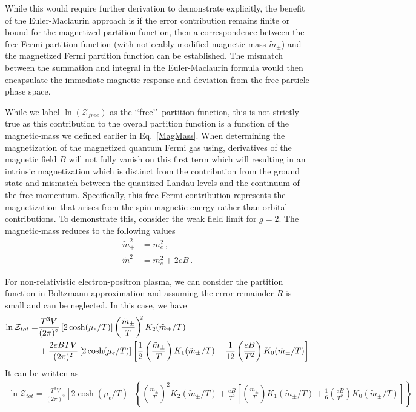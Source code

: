 \documentclass[Universe,article,submit,moreauthors,pdftex]{Definitions/mdpi}
\newcommand*{\req}[1]{Eq.~{\eqref{#1}}}
\begin{document}
While this would require further derivation to demonstrate explicitly, the benefit of the Euler-Maclaurin approach is if the error contribution remains finite or bound for the magnetized partition function, then a correspondence between the free Fermi partition function (with noticeably modified magnetic-mass $\tilde{m}_{\pm}$) and the magnetized Fermi partition function can be established. The mismatch between the summation and integral in the Euler-Maclaurin formula would then encapsulate the immediate magnetic response and deviation from the free particle phase space.

While we label $\ln(\mathcal{Z}_{free})$ as the \lq\lq free\rq\rq\ partition function, this is not strictly true as this contribution to the overall partition function is a function of the magnetic-mass we defined earlier in \req{MagMass}. When determining the magnetization of the magnetized quantum Fermi gas using, derivatives of the magnetic field $B$ will not fully vanish on this first term which will resulting in an intrinsic magnetization which is distinct from the contribution from the ground state and mismatch between the quantized Landau levels and the continuum of the free momentum. Specifically, this free Fermi contribution represents the magnetization that arises from the spin magnetic energy rather than orbital contributions. To demonstrate this, consider the weak field limit for $g=2$. The magnetic-mass reduces to the following values
\begin{align}
  \label{MagMassPlus} \tilde{m}_{+}^{2}&=m_{e}^{2}\,,\\
  \label{MagMassMinus} \tilde{m}_{-}^{2}&=m_{e}^{2}+2eB\,.
\end{align}

For non-relativistic electron-positron plasma, we can consider the partition function in Boltzmann approximation and assuming the error remainder $R$ is small and can be neglected. In this case, we have
\begin{align}
\ln\mathcal{Z}_{tot}=&\frac{T^3V}{(2\pi)^2}\left[2\cosh(\mu_e/T)\right]\left(\frac{\tilde m_\pm}{T}\right)^{\!\!2} K_2(\tilde m_\pm/T)\notag\\
&+\frac{2eBTV}{(2\pi)^2}\left[2\cosh(\mu_e/T)\right]\left[\frac{1}{2}\left(\frac{\tilde m_\pm}{T}\right)K_1(\tilde m_\pm/T)+\frac{1}{12}\left(\frac{eB}{T^2}\right)K_0(\tilde m_\pm/T)\right]
\end{align}
It can be written as
\begin{align}\label{lnZ}
\ln\mathcal{Z}_{tot}=\frac{T^3V}{(2\pi)^2}\left[2\cosh(\mu_e/T)\right]\left\{\left(\frac{\tilde m_\pm}{T}\right)^{\!\!2} K_2(\tilde m_\pm/T)+\frac{eB}{T^2} \left[\left(\frac{\tilde m_\pm}{T}\right)K_1(\tilde m_\pm/T)+\frac{1}{6}\left(\frac{eB}{T^2}\right)K_0(\tilde m_\pm/T)\right]
\right\}
\end{align}
\end{document}

